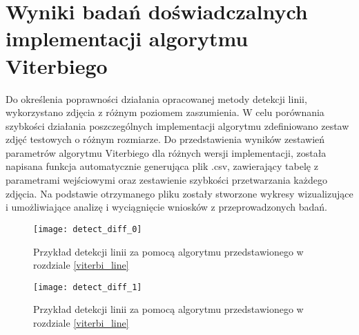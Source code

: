 \documentclass[document.tex]{subfiles}
\begin{document}
\chapter{Wyniki badań doświadczalnych \\ implementacji algorytmu Viterbiego}
\indent Do określenia poprawności działania opracowanej metody detekcji linii, 
wykorzystano zdjęcia z różnym poziomem zaszumienia. W celu porównania szybkości
działania poszczególnych implementacji algorytmu zdefiniowano zestaw zdjęć testowych
o różnym rozmiarze. Do przedstawienia wyników zestawień parametrów algorytmu Viterbiego
dla różnych wersji implementacji, została napisana funkcja automatycznie generująca plik .csv,
zawierający tabelę z parametrami wejściowymi oraz zestawienie szybkości przetwarzania każdego zdjęcia.
Na podstawie otrzymanego pliku zostały stworzone wykresy wizualizujące i umożliwiające
analizę i wyciągnięcie wniosków z przeprowadzonych badań.

\begin{figure}[h]
\texttt{[image: detect\_diff\_0]}
\caption{Przykład detekcji linii za pomocą algorytmu przedstawionego w rozdziale \ref{viterbi_line}}
\label{fig:sample_detect_0}
\end{figure}

\clearpage

\begin{figure}[h]
\texttt{[image: detect\_diff\_1]}
\caption{Przykład detekcji linii za pomocą algorytmu przedstawionego w rozdziale \ref{viterbi_line}}
\label{fig:sample_detect_1}
\end{figure}
\end{document}
